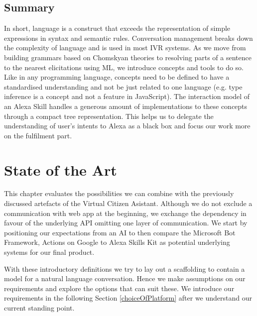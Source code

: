 \section{Summary}

In short, 
language is a construct that exceeds the representation of simple expressions in syntax and semantic rules.
Conversation management  %
breaks down the complexity of language and is used in most IVR systems. As we move from building grammars based on Chomskyan theories to resolving parts of a sentence to the nearest elicitations using ML, we introduce concepts and tools to do so. Like in any programming language, concepts need to be defined to have a standardised understanding and not be just related to one language (e.g. type inference is a concept and not a feature in JavaScript).  The interaction model of an Alexa Skill handles a generous amount of implementations to these concepts through a compact tree representation. This helps us to delegate the understanding of user's intents to Alexa as a black box and focus our work more on the fulfilment part. 








\chapter{State of the Art}
\label{stateofzart}


This chapter evaluates the possibilities we can combine with the previously discussed artefacts of the Virtual Citizen Asistant. Although we do not exclude a communication with web app at the beginning, we exchange the dependency in favour of the underlying API omitting one layer of communication. We start by positioning our expectations from an AI to then compare the Microsoft Bot Framework, Actions on Google to Alexa Skills Kit as potential underlying systems for our final product.

With these introductory definitions we try to lay out a scaffolding %
to contain a model for a natural language conversation. Hence we make assumptions on our requirements and explore the options that can suit these. We introduce our requirements in the following Section \ref{choiceOfPlatform} after we understand our current standing point.



